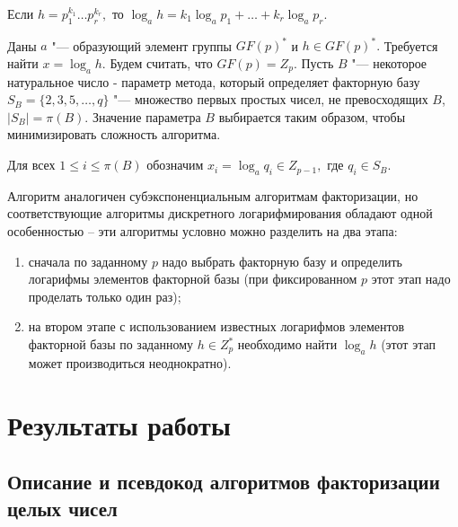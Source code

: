 \documentclass[bachelor, och, labwork]{shiza}
\begin{document}
        Если $h = p_1^{k_1} \dots p_r^{k_r},$ то $\log_a h = k_1 \log_a p_1 +
        \dots + k_r \log_a p_r.$

        Даны $a$ "--- образующий элемент группы $GF(p)^*$ и $h \in GF(p)^*.$
        Требуется найти $x = \log_a h.$ Будем считать, что $GF(p) = Z_p.$ Пусть
        $B$ "--- некоторое натуральное число - параметр метода, который
        определяет факторную базу $S_B = \{2, 3, 5, \dots, q \}$ "--- множество
        первых простых чисел, не превосходящих $B$, $|S_B| = \pi(B)$. Значение
        параметра $B$ выбирается таким образом, чтобы минимизировать сложность
        алгоритма.

        Для всех $1 \leq i \leq \pi(B)$ обозначим $x_i = \log_a q_i \in Z_{p -
        1},$ где $q_i \in S_B.$

        Алгоритм аналогичен субэкспоненциальным алгоритмам факторизации, но
        соответствующие алгоритмы дискретного логарифмирования обладают одной
        особенностью – эти алгоритмы условно можно разделить на два этапа:

        \begin{enumerate}
            \item сначала по заданному $p$ надо выбрать факторную базу и
            определить логарифмы элементов факторной базы (при фиксированном $p$
            этот этап надо проделать только один раз);
            \item на втором этапе с использованием известных логарифмов
            элементов факторной базы по заданному $h \in Z_p^*$ необходимо найти
            $\log_a h$ (этот этап может производиться неоднократно).
        \end{enumerate}


\section{Результаты работы}

    \subsection{Описание и псевдокод алгоритмов факторизации целых чисел}
\end{document}
